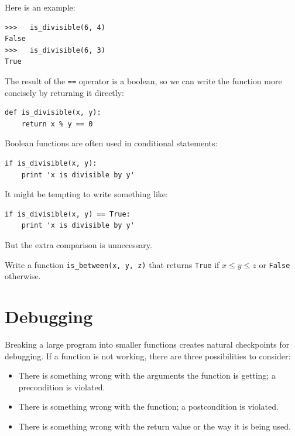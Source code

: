 Here is an example:

\beforeverb
\begin{verbatim}
>>>   is_divisible(6, 4)
False
>>>   is_divisible(6, 3)
True
\end{verbatim}
\afterverb
%
The result of the {\tt ==} operator is a boolean, so we can write the
function more concisely by returning it directly:

\beforeverb
\begin{verbatim}
def is_divisible(x, y):
    return x % y == 0
\end{verbatim}
\afterverb
%
Boolean functions are often used in conditional statements:


\beforeverb
\begin{verbatim}
if is_divisible(x, y):
    print 'x is divisible by y'
\end{verbatim}
\afterverb
%
It might be tempting to write something like:

\beforeverb
\begin{verbatim}
if is_divisible(x, y) == True:
    print 'x is divisible by y'
\end{verbatim}
\afterverb
%
But the extra comparison is unnecessary.

\begin{ex}
Write a function \verb"is_between(x, y, z)" that
returns {\tt True} if $x \le y \le z$ or {\tt False} otherwise.
\end{ex}


\section{Debugging}
\label{factdebug}


Breaking a large program into smaller functions creates natural
checkpoints for debugging.  If a function is not working, there are
three possibilities to consider:

\begin{itemize}

\item There is something wrong with the arguments the function
is getting; a precondition is violated.

\item There is something wrong with the function; a postcondition
is violated.

\item There is something wrong with the return value or the
way it is being used.

\end{itemize}


